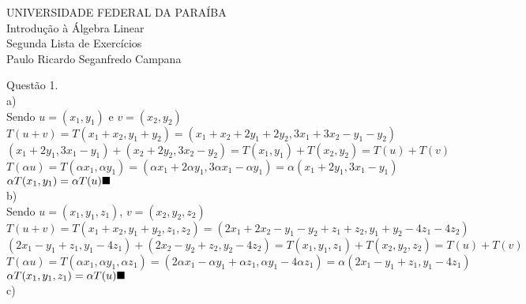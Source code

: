 \documentclass[12pt]{article}
\begin{document}
\begin{center}
	UNIVERSIDADE FEDERAL DA PARAÍBA\\
	Introdução à Álgebra Linear\\
	Segunda Lista de Exercícios\\
	Paulo Ricardo Seganfredo Campana\\
\end{center}
	
\noindent Questão 1.\\

\noindent a)\\

Sendo $u=(x_{1},y_{1})$ e $v=(x_{2},y_{2})$\\

$T(u+v)=T(x_{1}+x_{2},y_{1}+y_{2})=(x_{1}+x_{2}+2y_{1}+2y_{2},3x_{1}+3x_{2}-y_{1}-y_{2})$\\

$(x_{1}+2y_{1},3x_{1}-y_{1})+(x_{2}+2y_{2},3x_{2}-y_{2})=T(x_{1},y_{1})+T(x_{2},y_{2})=T(u)+T(v)$\\

$T(\alpha u)=T(\alpha x_{1}, \alpha y_{1})=(\alpha x_{1}+2\alpha y_{1},3\alpha x_{1}-\alpha y_{1})=\alpha(x_{1}+2y_{1},3x_{1}-y_{1})$\\

$\alpha T(x_{1},y_{1})=\alpha T(u)\hfill\blacksquare$\\

\noindent b)\\

Sendo $u=(x_{1},y_{1},z_{1})$, $v=(x_{2},y_{2},z_{2})$\\

$T(u+v)=T(x_{1}+x_{2},y_{1}+y_{2},z_{1},z_{2})=(2x_{1}+2x_{2}-y_{1}-y_{2}+z_{1}+z_{2},y_{1}+y_{2}-4z_{1}-4z_{2})$\\
	
$(2x_{1}-y_{1}+z_{1},y_{1}-4z_{1})+(2x_{2}-y_{2}+z_{2},y_{2}-4z_{2})=T(x_{1},y_{1},z_{1})+T(x_{2},y_{2},z_{2})=T(u)+T(v)$\\

$T(\alpha u)=T(\alpha x_{1},\alpha y_{1},\alpha z_{1})=(2\alpha x_{1}-\alpha y_{1}+\alpha z_{1},\alpha y_{1}-4\alpha z_{1})=\alpha(2x_{1}-y_{1}+z_{1},y_{1}-4z_{1})$\\

$\alpha T(x_{1},y_{1},z_{1})=\alpha T(u)\hfill\blacksquare$\\

\noindent c)\\
\end{document}
